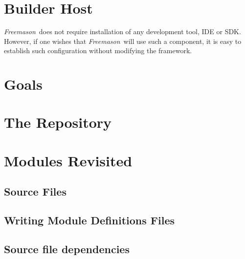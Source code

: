 \documentclass[a4paper]{article}
\newcommand{\freemason}{\textit{Freemason}}
\begin{document}
\chapter{Builder Host}

\freemason\ does not require installation of any development tool, IDE or SDK. However, if one wishes
that \freemason\ will use such a component, it is easy to establish such configuration without modifying
the framework.

\chapter{Goals}

\chapter{The Repository}

\chapter{Modules Revisited}

\section{Source Files}

\section{Writing Module Definitions Files}

\section{Source file dependencies}

\end{document}
